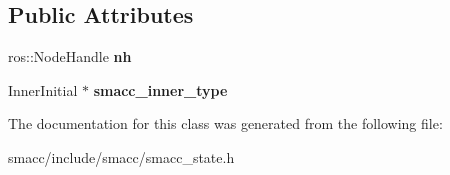 \subsection*{Public Attributes}
\begin{DoxyCompactItemize}
\item 
ros\+::\+Node\+Handle {\bfseries nh}\hypertarget{classsmacc_1_1SmaccState_a5e0564f2114c6af88a4a8ed6bba97f40}{}\label{classsmacc_1_1SmaccState_a5e0564f2114c6af88a4a8ed6bba97f40}

\item 
Inner\+Initial $\ast$ {\bfseries smacc\+\_\+inner\+\_\+type}\hypertarget{classsmacc_1_1SmaccState_a087d0f66729b98614feb8c59ea548af1}{}\label{classsmacc_1_1SmaccState_a087d0f66729b98614feb8c59ea548af1}

\end{DoxyCompactItemize}


The documentation for this class was generated from the following file\+:\begin{DoxyCompactItemize}
\item 
smacc/include/smacc/smacc\+\_\+state.\+h\end{DoxyCompactItemize}
